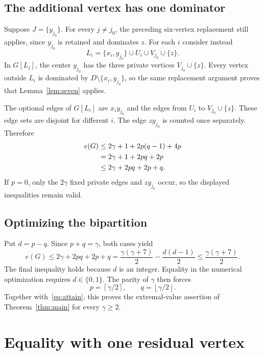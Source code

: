 \documentclass[11pt]{article}
\theoremstyle{definition}
\theoremstyle{remark}
\newcommand{\e}{e}
\newcommand{\ceil}[1]{\left\lceil#1\right\rceil}
\newcommand{\floor}[1]{\left\lfloor#1\right\rfloor}
\begin{document}
\subsection{The additional vertex has one dominator}

Suppose $J=\{y_{j_0}\}$. For every $j\ne j_0$, the preceding six-vertex
replacement still applies, since $y_{j_0}$ is retained and dominates $z$.
For each $i$ consider instead
\[
 L_i=\{x_i,y_{j_0}\}\cup U_i\cup V_{j_0}\cup\{z\}.
\]
In $G[L_i]$, the center $y_{j_0}$ has the three private vertices
$V_{j_0}\cup\{z\}$. Every vertex outside $L_i$ is dominated by
$D\setminus\{x_i,y_{j_0}\}$, so the same replacement argument proves that
Lemma~\ref{lem:seven} applies.

The optional edges of $G[L_i]$ are $x_i y_{j_0}$ and the edges from $U_i$
to $V_{j_0}\cup\{z\}$. These edge sets are disjoint for different $i$.
The edge $zy_{j_0}$ is counted once separately. Therefore
\begin{align}
 \e(G)&\le 2\gamma+1+2p(q-1)+4p\notag\\
       &=2\gamma+1+2pq+2p\notag\\
       &\le2\gamma+2pq+2p+q.\label{eq:single}
\end{align}
If $p=0$, only the $2\gamma$ fixed private edges and $zy_{j_0}$ occur,
so the displayed inequalities remain valid.

\subsection{Optimizing the bipartition}

Put $d=p-q$. Since $p+q=\gamma$, both cases yield
\begin{equation}\label{eq:opt}
 \e(G)\le 2\gamma+2pq+2p+q
 =\frac{\gamma(\gamma+7)}2-\frac{d(d-1)}2
 \le\frac{\gamma(\gamma+7)}2.
\end{equation}
The final inequality holds because $d$ is an integer. Equality in the
numerical optimization requires $d\in\{0,1\}$. The parity of $\gamma$
then forces
\begin{equation}\label{eq:balanced}
 p=\ceil{\gamma/2},\qquad q=\floor{\gamma/2}.
\end{equation}
Together with~\eqref{eq:attain}, this proves the extremal-value assertion of
Theorem~\ref{thm:main} for every $\gamma\ge2$.

\section{Equality with one residual vertex}\label{sec:rigidity}
\end{document}
